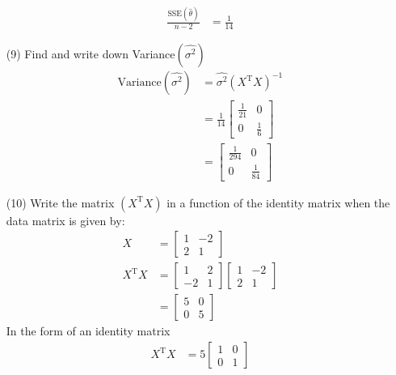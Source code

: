 \documentclass[12pt,a4paper]{article}
\begin{document}
\begin{enumerate}
\begin{align*}
			\frac{\text{SSE}(\hat{\theta})}{n -2} &= \frac{1}{14}
		\end{align*}
	\item[(9)] Find and write down Variance$(\hat{\sigma^2})$
	\begin{align*}
			\text{Variance}(\hat{\sigma^2}) &= \hat{\sigma^2} (X^{\text{T}}X)^{-1} \\
			&=  \frac{1}{14} \begin{bmatrix}
								\frac{1}{21} & 0\\
								0 & \frac{1}{6}
						\end{bmatrix}\\
			&= \begin{bmatrix}
								\frac{1}{294} & 0\\
								0 & \frac{1}{84}
						\end{bmatrix}
	\end{align*}
	\item[(10)] Write the matrix $(X^{\text{T}}X)$ in a function of the identity matrix when the data matrix is given by:
		\begin{align*}
				X & = \begin{bmatrix}
							1 & -2\\
							2 & 1
				\end{bmatrix}\\
				X^{\text{T}}X &=  \begin{bmatrix}
							1 & 2\\
							-2 & 1
				\end{bmatrix}  \begin{bmatrix}
							1 & -2\\
							2 & 1
				\end{bmatrix}\\
				&=  \begin{bmatrix}
							5 & 0\\
							0 & 5
				\end{bmatrix}
		\end{align*}
	In the form of an identity matrix 
	\begin{align*}
			X^{\text{T}}X 	&=  5 \begin{bmatrix}
							1 & 0\\
							0 & 1
				\end{bmatrix}
	\end{align*}
\end{enumerate}
\pagebreak
\end{document}
